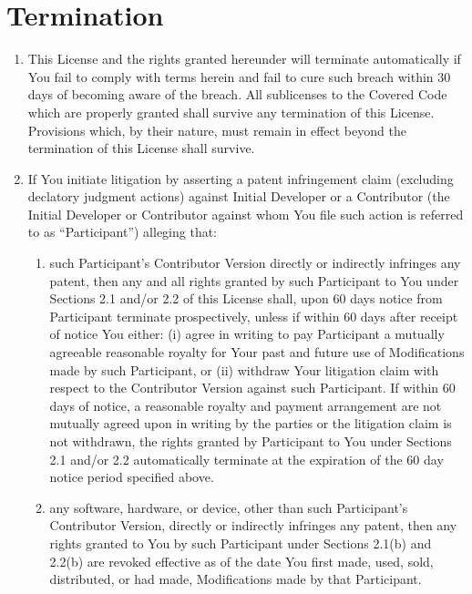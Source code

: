 \documentclass[letterpaper,colorlinks=true,linkcolor=blue]{book}
\begin{document}
\section{Termination}
\begin{enumerate}
\renewcommand{\theenumi}{\arabic{section}.\arabic{enumi}}
\item This License and the rights granted hereunder will terminate automatically if You fail to comply with terms herein and fail to cure such breach within 30 days of becoming aware of the breach. All sublicenses to the Covered Code which are properly granted shall survive any termination of this License. Provisions which, by their nature, must remain in effect beyond the termination of this License shall survive. 

\item If You initiate litigation by asserting a patent infringement claim (excluding declatory judgment actions) against Initial Developer or a Contributor (the Initial Developer or Contributor against whom You file such action is referred to as ``Participant'') alleging that: 

\renewcommand{\theenumii}{\alph{enumii}}
  \begin{enumerate}
  \item such Participant's Contributor Version directly or indirectly infringes any patent, then any and all rights granted by such Participant to You under Sections 2.1 and/or 2.2 of this License shall, upon 60 days notice from Participant terminate prospectively, unless if within 60 days after receipt of notice You either: (i) agree in writing to pay Participant a mutually agreeable reasonable royalty for Your past and future use of Modifications made by such Participant, or (ii) withdraw Your litigation claim with respect to the Contributor Version against such Participant. If within 60 days of notice, a reasonable royalty and payment arrangement are not mutually agreed upon in writing by the parties or the litigation claim is not withdrawn, the rights granted by Participant to You under Sections 2.1 and/or 2.2 automatically terminate at the expiration of the 60 day notice period specified above. 

\item any software, hardware, or device, other than such Participant's Contributor Version, directly or indirectly infringes any patent, then any rights granted to You by such Participant under Sections 2.1(b) and 2.2(b) are revoked effective as of the date You first made, used, sold, distributed, or had made, Modifications made by that Participant. 
  \end{enumerate}


\end{enumerate}
\end{document}
